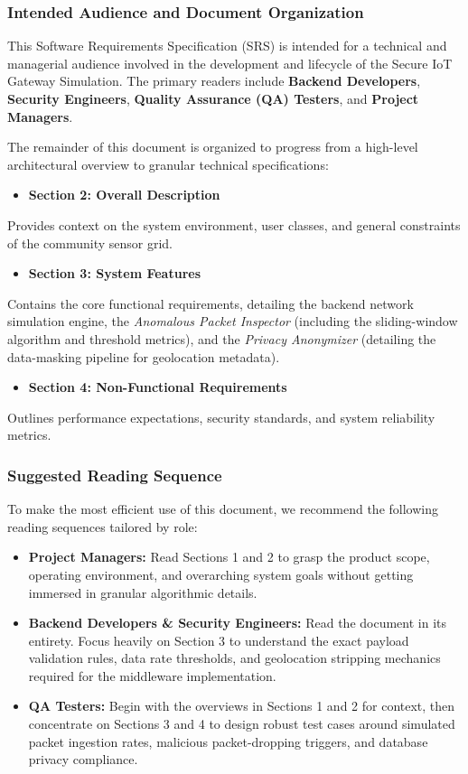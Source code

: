 \documentclass[12pt,letterpaper]{article}
\begin{document}
\subsubsection{Intended Audience and Document Organization}
This Software Requirements Specification (SRS) is intended for a technical and managerial audience involved in the development and lifecycle of the Secure IoT Gateway Simulation. The primary readers include \textbf{Backend Developers}, \textbf{Security Engineers}, \textbf{Quality Assurance (QA) Testers}, and \textbf{Project Managers}.\par
The remainder of this document is organized to progress from a high-level architectural overview to granular technical specifications:\par
\begin{itemize}
\item \textbf{Section 2: Overall Description}
\end{itemize}
Provides context on the system environment, user classes, and general constraints of the community sensor grid.\par
\begin{itemize}
\item \textbf{Section 3: System Features}
\end{itemize}
Contains the core functional requirements, detailing the backend network simulation engine, the \emph{Anomalous Packet Inspector} (including the sliding-window algorithm and threshold metrics), and the \emph{Privacy Anonymizer} (detailing the data-masking pipeline for geolocation metadata).\par
\begin{itemize}
\item \textbf{Section 4: Non-Functional Requirements}
\end{itemize}
Outlines performance expectations, security standards, and system reliability metrics.\par
\subsubsection{Suggested Reading Sequence}
To make the most efficient use of this document, we recommend the following reading sequences tailored by role:\par
\begin{itemize}
\item \textbf{Project Managers:} Read Sections 1 and 2 to grasp the product scope, operating environment, and overarching system goals without getting immersed in granular algorithmic details.
\item \textbf{Backend Developers \& Security Engineers:} Read the document in its entirety. Focus heavily on Section 3 to understand the exact payload validation rules, data rate thresholds, and geolocation stripping mechanics required for the middleware implementation.
\item \textbf{QA Testers:} Begin with the overviews in Sections 1 and 2 for context, then concentrate on Sections 3 and 4 to design robust test cases around simulated packet ingestion rates, malicious packet-dropping triggers, and database privacy compliance.
\end{itemize}
\vspace{0.08in}
\end{document}
